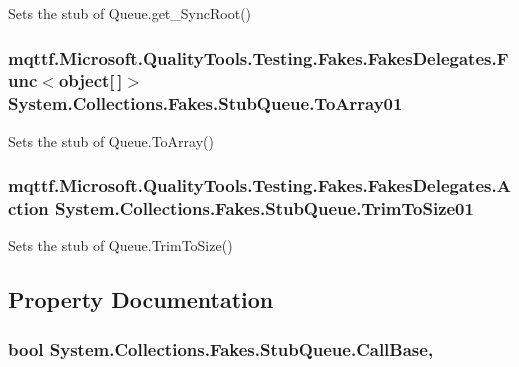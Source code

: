 Sets the stub of Queue.\-get\-\_\-\-Sync\-Root()

\hypertarget{class_system_1_1_collections_1_1_fakes_1_1_stub_queue_ae9f3e1e46864199f9d6181ed78a51f29}{
\subsubsection[{To\-Array01}]{\setlength{\rightskip}{0pt plus 5cm}mqttf.\-Microsoft.\-Quality\-Tools.\-Testing.\-Fakes.\-Fakes\-Delegates.\-Func$<$object\mbox{[}$\,$\mbox{]}$>$ System.\-Collections.\-Fakes.\-Stub\-Queue.\-To\-Array01}}\label{class_system_1_1_collections_1_1_fakes_1_1_stub_queue_ae9f3e1e46864199f9d6181ed78a51f29}


Sets the stub of Queue.\-To\-Array()

\hypertarget{class_system_1_1_collections_1_1_fakes_1_1_stub_queue_a407fedfcafb310701d7434bcbafb6783}{
\subsubsection[{Trim\-To\-Size01}]{\setlength{\rightskip}{0pt plus 5cm}mqttf.\-Microsoft.\-Quality\-Tools.\-Testing.\-Fakes.\-Fakes\-Delegates.\-Action System.\-Collections.\-Fakes.\-Stub\-Queue.\-Trim\-To\-Size01}}\label{class_system_1_1_collections_1_1_fakes_1_1_stub_queue_a407fedfcafb310701d7434bcbafb6783}


Sets the stub of Queue.\-Trim\-To\-Size()



\subsection{Property Documentation}
\hypertarget{class_system_1_1_collections_1_1_fakes_1_1_stub_queue_af8e85de8544d9c9900bdb8a3e651a3f9}{
\subsubsection[{Call\-Base}]{\setlength{\rightskip}{0pt plus 5cm}bool System.\-Collections.\-Fakes.\-Stub\-Queue.\-Call\-Base\hspace{0.3cm}{\ttfamily [get]}, {\ttfamily [set]}}}\label{class_system_1_1_collections_1_1_fakes_1_1_stub_queue_af8e85de8544d9c9900bdb8a3e651a3f9}


